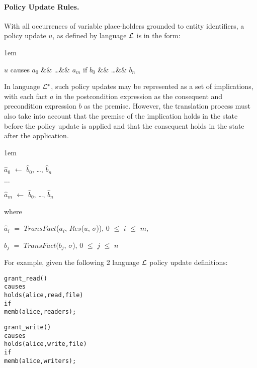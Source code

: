\documentclass[11pt, twocolumn]{article}
\newenvironment{vquote}
  {\begin{list}{}{\leftmargin 1em}\item[]}
  {\end{list}}
\newenvironment{vverbatim}
  {\begin{alltt}}
  {\vspace{-\baselineskip}\end{alltt}}
\begin{document}
        \paragraph{Policy Update Rules.}

          With all occurrences of variable place-holders grounded to entity
          identifiers, a policy update $u$, as defined by language ${\cal L}$
          is in the form:

          \begin{vquote}
            $u$ causes $a_{0}$ \&\& \ldots \&\& $a_{m}$
            if $b_{0}$ \&\& \ldots \&\& $b_{n}$
          \end{vquote}

          In language ${\cal L}^{*}$, such policy updates may be represented as
          a set of implications, with each fact $a$ in the postcondition
          expression as the consequent and precondition expression $b$ as the
          premise. However, the translation process must also take into account
          that the premise of the implication holds in the state before the
          policy update is applied and that the consequent holds in the state
          after the application.

          \begin{vquote}
            $\hat{a}_{0}$ $\leftarrow$ $\hat{b}_{0}$, \ldots, $\hat{b}_{n}$

            $\ldots$

            $\hat{a}_{m}$ $\leftarrow$ $\hat{b}_{0}$, \ldots, $\hat{b}_{n}$

            where

            $\hat{a}_{i}$ $=$ $TransFact$($a_{i}$, $Res$($u$, $\sigma$)),
            $0$ $\leq$ $i$ $\leq$ $m$,

            $\hat{b}_{j}$ $=$ $TransFact$($b_{j}$, $\sigma$),
            $0$ $\leq$ $j$ $\leq$ $n$
          \end{vquote}

          For example, given the following 2 language ${\cal L}$ policy update
          definitions:

          \begin{vverbatim}
  grant\_read()
    causes
      holds(alice, read, file)
    if
      memb(alice, readers);

  grant\_write()
    causes
      holds(alice, write, file)
    if
      memb(alice, writers);
          \end{vverbatim}
\end{document}
